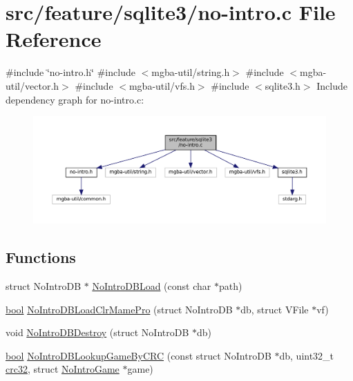 \hypertarget{no-intro_8c}{}\section{src/feature/sqlite3/no-\/intro.c File Reference}
\label{no-intro_8c}
{\ttfamily \#include \char`\"{}no-\/intro.\+h\char`\"{}}\newline
{\ttfamily \#include $<$mgba-\/util/string.\+h$>$}\newline
{\ttfamily \#include $<$mgba-\/util/vector.\+h$>$}\newline
{\ttfamily \#include $<$mgba-\/util/vfs.\+h$>$}\newline
{\ttfamily \#include $<$sqlite3.\+h$>$}\newline
Include dependency graph for no-\/intro.c\+:
\nopagebreak
\begin{figure}[H]
\begin{center}
\leavevmode
\includegraphics[width=350pt]{no-intro_8c__incl}
\end{center}
\end{figure}
\subsection*{Functions}
\begin{DoxyCompactItemize}
\item 
struct No\+Intro\+DB $\ast$ \mbox{\hyperlink{no-intro_8c_a467dbcef29eb2a06f7b5747e6ee4fddb}{No\+Intro\+D\+B\+Load}} (const char $\ast$path)
\item 
\mbox{\hyperlink{libretro_8h_a4a26dcae73fb7e1528214a068aca317e}{bool}} \mbox{\hyperlink{no-intro_8c_a0ce34503c62adbfd6accf09a9ce89260}{No\+Intro\+D\+B\+Load\+Clr\+Mame\+Pro}} (struct No\+Intro\+DB $\ast$db, struct V\+File $\ast$vf)
\item 
void \mbox{\hyperlink{no-intro_8c_a1a941643f11437a5ef79fc8ef7c4e55e}{No\+Intro\+D\+B\+Destroy}} (struct No\+Intro\+DB $\ast$db)
\item 
\mbox{\hyperlink{libretro_8h_a4a26dcae73fb7e1528214a068aca317e}{bool}} \mbox{\hyperlink{no-intro_8c_a8aa1074ddc85b995d2949c72e356f0d1}{No\+Intro\+D\+B\+Lookup\+Game\+By\+C\+RC}} (const struct No\+Intro\+DB $\ast$db, uint32\+\_\+t \mbox{\hyperlink{util_2crc32_8c_a0bdd14723a2507e6465c44ca5d9dc364}{crc32}}, struct \mbox{\hyperlink{no-intro_8h_struct_no_intro_game}{No\+Intro\+Game}} $\ast$game)
\end{DoxyCompactItemize}


